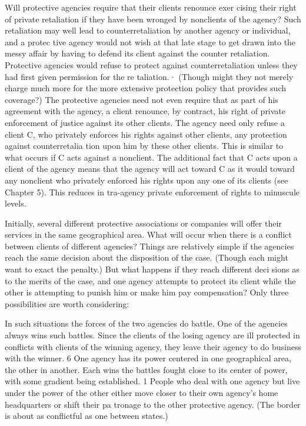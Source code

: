 \documentclass[11pt,openany]{book}
\begin{document}
Will protective agencies require that their clients renounce exer cising their right of private retaliation if they have been wronged by nonclients of the agency? Such retaliation may well lead to counterretaliation by another agency or individual, and a protec tive agency would not wish at that late stage to get drawn into the messy affair by having to defend its client against the counter retaliation. Protective agencies would refuse to protect against counterretaliation unless they had first given permission for the re taliation.· (Though might they not merely charge much more for the more extensive protection policy that provides such coverage?) The protective agencies need not even require that as part of his agreement with the agency, a client renounce, by contract, his right of private enforcement of justice against its other clients. The agency need only refuse a client C, who privately enforces his rights against other clients, any protection against counterretalia tion upon him by these other clients. This is similar to what occurs if C acts against a nonclient. The additional fact that C acts upon a client of the agency means that the agency will act toward C as it would toward any nonclient who privately enforced his rights upon any one of its clients (see Chapter 5). This reduces in tra-agency private enforcement of rights to minuscule levels. 

Initially, several different protective associations or companies will offer their services in the same geographical area. What will occur when there is a conflict between clients of different agencies? Things are relatively simple if the agencies reach the same decision about the disposition of the case. (Though each might want to exact the penalty.) But what happens if they reach different deci sions as to the merits of the case, and one agency attempts to protect its client while the other is attempting to punish him or make him pay compensation? Only three possibilities are worth considering: 

In such situations the forces of the two agencies do battle. One of the agencies always wins such battles. Since the clients of the losing agency are ill protected in conflicts with clients of the winning agency, they leave their agency to do business with the winner. 6 One agency has its power centered in one geographical area, the other in another. Each wins the battles fought close to its center of power, with some gradient being established. 1 People who deal with one agency but live under the power of the other either move closer to their own agency's home headquarters or shift their pa tronage to the other protective agency. (The border is about as conflictful as one between states.) 
\end{document}
